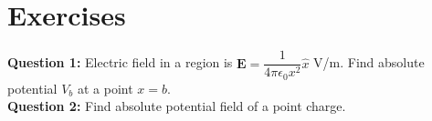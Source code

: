 \documentclass[12pt,a4paper]{article}
\begin{document}
\section{Exercises}
\noindent\textbf{Question 1:} Electric field in a region is $\textbf{E}=\dfrac{1}{4\pi\epsilon_0x^2}\hat x$ V/m. Find absolute potential $V_b$ at a point $x=b$.\\[0.2cm]
\noindent\textbf{Question 2:} Find absolute potential field of a point charge.
%
%
\end{document}

